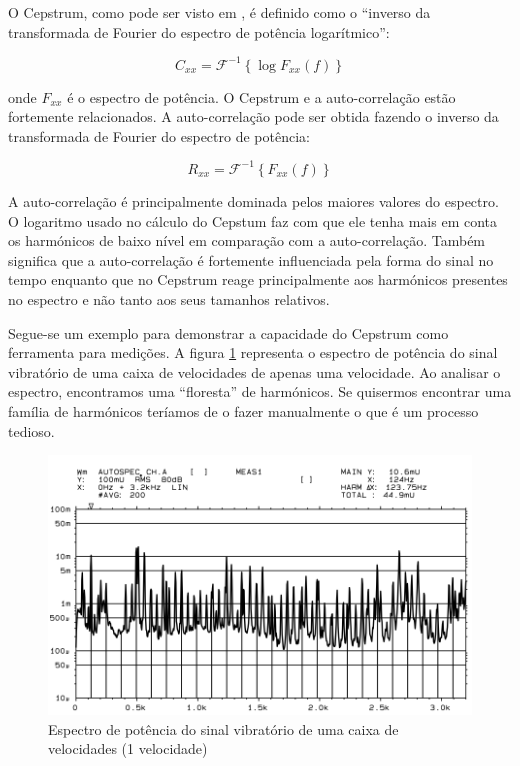 O Cepstrum, como pode ser visto em \textcite{Notes}, é definido como o ``inverso da transformada de Fourier do espectro de potência logarítmico'': 

\begin{equation}
	C_{xx} = \mathcal{F}^{-1} \left \{ \log F_{xx}\left ( f \right ) \right \}
\end{equation}

	
	onde $F_{xx}$ é o espectro de potência. O Cepstrum e a auto-correlação estão fortemente relacionados. A auto-correlação pode ser obtida fazendo o inverso da transformada de Fourier do espectro de potência: 
	
\begin{equation}
	R_{xx} = \mathcal{F}^{-1} \left \{ F_{xx}\left ( f \right ) \right \}
\end{equation}


A auto-correlação é principalmente dominada pelos maiores valores do espectro. O logaritmo usado no cálculo do Cepstum faz com que ele tenha mais em conta os harmónicos de baixo nível em comparação com a auto-correlação. Também significa que a auto-correlação é fortemente influenciada pela forma do sinal no tempo enquanto que no Cepstrum reage principalmente aos harmónicos presentes no espectro e não tanto aos seus tamanhos relativos.

Segue-se um exemplo para demonstrar a capacidade do Cepstrum como ferramenta para medições. A figura \ref{spectrum Cepstrum1} representa o espectro de potência do sinal vibratório de uma caixa de velocidades de apenas uma velocidade. Ao analisar o espectro, encontramos uma ``floresta'' de harmónicos. Se quisermos encontrar uma família de harmónicos teríamos de o fazer manualmente o que é um processo tedioso.
	

\begin{figure}[H]
\centering
\includegraphics[scale=0.35]{figs/spectrum_cepstrum1}
\caption{Espectro de potência do sinal vibratório de uma caixa de velocidades (1 velocidade) \cite{Notes2}}\label{spectrum Cepstrum1}
\end{figure}


